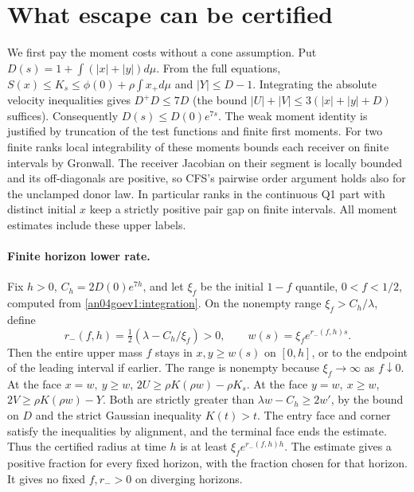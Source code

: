 \documentclass[11pt]{article}
\begin{document}
\section{What escape can be certified}\label{an04goev1:escape}
We first pay the moment costs without a cone assumption. Put
\(D(s)=1+\int(|x|+|y|)d\mu\). From the full equations,
\(S(x)\le K_s\le\phi(0)+\rho\int x_+d\mu\) and \(|Y|\le D-1\).
Integrating the absolute velocity inequalities gives \(D^+D\le7D\)
(the bound \(|U|+|V|\le3(|x|+|y|+D)\) suffices).
Consequently \(D(s)\le D(0)e^{7s}\). The weak moment identity is
justified by truncation of the test functions and finite first moments.
For two finite ranks local integrability of these moments bounds each
receiver on finite intervals by Gronwall. The receiver Jacobian on
their segment is locally bounded and its off-diagonals are positive,
so CFS's pairwise order argument holds also for the unclamped donor
law. In particular ranks in the continuous Q1 part with distinct
initial \(x\) keep a strictly positive pair gap on finite intervals.
All moment estimates include these upper labels.

\paragraph{Finite horizon lower rate.}
Fix \(h>0\), \(C_h=2D(0)e^{7h}\), and let \(\xi_f\) be the initial
\(1-f\) quantile, \(0<f<1/2\), computed from
\eqref{an04goev1:integration}. On the nonempty range
\(\xi_f>C_h/\lambda\), define
\[
 r_-(f,h)=\tfrac12(\lambda-C_h/\xi_f)>0,\qquad
 w(s)=\xi_f e^{r_-(f,h)s}.
\]
Then the entire upper mass \(f\) stays in \(x,y\ge w(s)\) on
\([0,h]\), or to the endpoint of the leading interval if earlier.
The range is nonempty because \(\xi_f\to\infty\) as \(f\downarrow0\).
At the face \(x=w,\ y\ge w\),
\(2U\ge\rho K(\rho w)-\rho K_s\). At the face \(y=w,\ x\ge w\),
\(2V\ge\rho K(\rho w)-Y\). Both are strictly greater than
\(\lambda w-C_h\ge2w'\), by the bound on \(D\) and the strict
Gaussian inequality \(K(t)>t\). The entry face and corner satisfy
the inequalities by alignment, and the terminal face ends the
estimate. Thus the certified radius at time \(h\) is at least
\(\xi_f e^{r_-(f,h)h}\). The estimate gives a positive fraction for
every fixed horizon, with the fraction chosen for that horizon.
It gives no fixed \(f,r_->0\) on diverging horizons.
\end{document}
